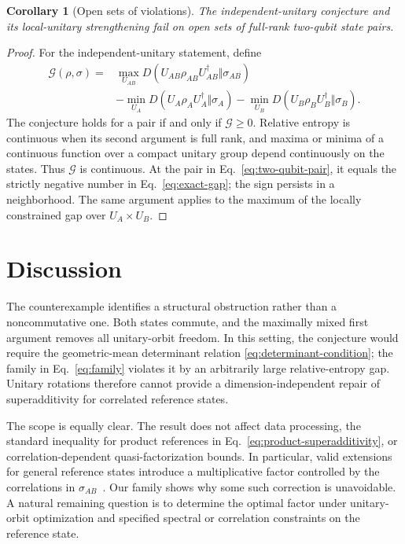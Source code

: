 \documentclass[
  aps,
  pra,
  reprint,
  superscriptaddress,
  nofootinbib,
  longbibliography
]{revtex4-2}
\newtheorem{corollary}[theorem]{Corollary}
\theoremstyle{remark}
\begin{document}
\begin{corollary}[Open sets of violations]
\label{cor:open}
The independent-unitary conjecture and its local-unitary strengthening fail
on open sets of full-rank two-qubit state pairs.
\end{corollary}

\begin{proof}
For the independent-unitary statement, define
\begin{align}
 \mathcal{G}(\rho,\sigma)
 ={}&\max_{U_{AB}}
 D(U_{AB}\rho_{AB}U_{AB}^{\dagger}\Vert\sigma_{AB})
 \nonumber\\
 &-\min_{U_A}D(U_A\rho_AU_A^{\dagger}\Vert\sigma_A)
 -\min_{U_B}D(U_B\rho_BU_B^{\dagger}\Vert\sigma_B).
 \label{eq:optimized-gap}
\end{align}
The conjecture holds for a pair if and only if $\mathcal{G}\geq0$.  Relative
entropy is continuous when its second argument is full rank, and maxima or
minima of a continuous function over a compact unitary group depend
continuously on the states.  Thus $\mathcal{G}$ is continuous.  At the pair
in Eq.~\eqref{eq:two-qubit-pair}, it equals the strictly negative number in
Eq.~\eqref{eq:exact-gap}; the sign persists in a neighborhood.  The same
argument applies to the maximum of the locally constrained gap over
$U_A\times U_B$.
\end{proof}

\section{Discussion}

The counterexample identifies a structural obstruction rather than a
noncommutative one.  Both states commute, and the maximally mixed first
argument removes all unitary-orbit freedom.  In this setting, the conjecture
would require the geometric-mean determinant relation
\eqref{eq:determinant-condition}; the family in Eq.~\eqref{eq:family}
violates it by an arbitrarily large relative-entropy gap.  Unitary rotations
therefore cannot provide a dimension-independent repair of superadditivity
for correlated reference states.

The scope is equally clear.  The result does not affect data processing,
the standard inequality for product references in
Eq.~\eqref{eq:product-superadditivity}, or correlation-dependent
quasi-factorization bounds.  In particular, valid extensions for general
reference states introduce a multiplicative factor controlled by the
correlations in $\sigma_{AB}$~\cite{CapelLuciaPerezGarcia2018}.  Our family
shows why some such correction is unavoidable.  A natural remaining
question is to determine the optimal factor under unitary-orbit optimization
and specified spectral or correlation constraints on the reference state.
\end{document}
